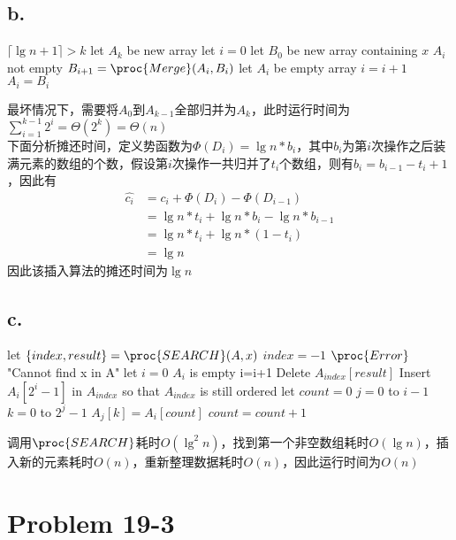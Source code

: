 \documentclass{article}
\begin{document}
  		\subsection*{b.}
  			\begin{codebox}
  				\li \If $\lceil\lg{n+1}\rceil > k$
  				\li \Then let $A_{k}$ be new array
  				\End
  				\li let $i=0$
  				\li let $B_0$ be new array containing $x$
  				\li \While $A_i$ not empty
  				\li \Do $B_{i+1}=\proc{Merge}(A_i,B_i)$
  				\li let $A_i$ be empty array
  				\li $i=i+1$
  				\End
  				\li $A_i=B_i$
  			\end{codebox}
  			最坏情况下，需要将$A_0$到$A_{k-1}$全部归并为$A_k$，此时运行时间为$\sum_{i=1}^{k-1}2^i=\Theta(2^k)=\Theta(n)$ \\
  			下面分析摊还时间，定义势函数为$\Phi(D_i)=\lg{n}*b_i$，其中$b_i$为第$i$次操作之后装满元素的数组的个数，假设第$i$次操作一共归并了$t_i$个数组，则有$b_i=b_{i-1}-t_i+1$，因此有
  			\begin{align*}
	  			\hat{c_i} &= c_i+\Phi(D_i)-\Phi(D_{i-1}) \\
	  			&= \lg{n}*t_i + \lg{n}*b_i-\lg{n}*b_{i-1} \\
	  			&= \lg{n}*t_i+\lg{n}*(1-t_i) \\
	  			&= \lg{n}
  			\end{align*}
  			因此该插入算法的摊还时间为$\lg{n}$
  		\subsection*{c.}
  			\begin{codebox}
  				\Procname{\proc{DELETE}(A,x)}
  				\li let $\{index,result\}=\proc{SEARCH}(A,x)$
  				\li \If $index=-1$
  				\li \Then $\proc{Error}$ "Cannot find x in A"
  				\End
  				\li let $i=0$
  				\li \While $A_i$ is empty
  				\li \Do i=i+1
  				\End
  				\li Delete $A_{index}[result]$
  				\li Insert $A_i[2^i-1]$ in $A_{index}$ so that $A_{index}$ is still ordered
  				\li let $count=0$
  				\li \For $j=0$ to $i-1$
  				\li \Then \For $k=0$ to $2^j-1$
  				\li \Then $A_j[k]=A_i[count]$
  				\li $count=count+1$
  				\End
  				\End
  			\end{codebox}
  			调用$\proc{SEARCH}$耗时$O(\lg^2{n})$，找到第一个非空数组耗时$O(\lg n)$，插入新的元素耗时$O(n)$，重新整理数据耗时$O(n)$，因此运行时间为$O(n)$
  	\section*{Problem 19-3}
\end{document}
